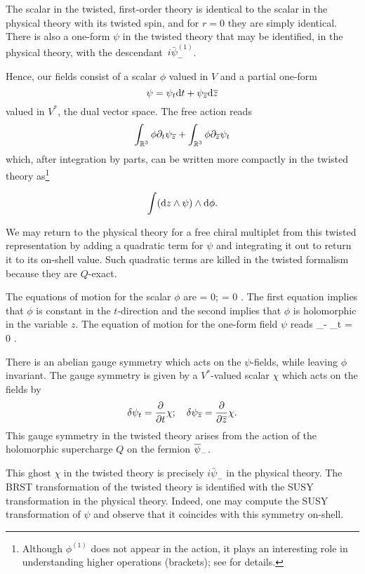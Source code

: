 \documentclass[11pt]{amsart}
\begin{document}
The scalar in the twisted, first-order theory is identical to the scalar in the physical theory with its twisted spin, and for $r=0$ they are simply identical. There is also a one-form $\psi$ in the twisted theory that may be identified, in the physical theory, with the descendant~$i \bar{\psi}_-^{(1)}$.

Hence, our fields consist of a scalar $\phi$ valued in $V$ and a partial one-form 
\[
\psi = \psi_t \d t + \psi_\zbar \d \zbar 
\]
valued in $V^*$, the dual vector space.
The free action reads
\[
\int_{\RR^3} \phi \partial_t \psi_\zbar + \int_{\RR^3} \phi \partial_\zbar \psi_t 
\]
which, after integration by parts, can be written more compactly in the twisted theory as\footnote{Although $\phi^{(1)}$ does not appear in the action, it plays an interesting role in understanding higher operations (brackets); see \cite{CDG} for details.}

\[
\int(\d z \wedge \psi) \wedge \d \phi.
\]

We may return to the physical theory for a free chiral multiplet from this twisted representation by adding a quadratic term for $\psi$ and integrating it out to return it to its on-shell value. 
Such quadratic terms are killed in the twisted formalism because they are $Q$-exact.  

The equations of motion for the scalar $\phi$ are
\beqn\label{eqn:phiEOM}
 \phi = 0; \quad
\frac{\partial}{\partial \zbar} \phi = 0 .
\eeqn
The first equation implies that $\phi$ is constant in the $t$-direction and the second implies that $\phi$ is holomorphic in the variable $z$. 
The equation of motion for the one-form field $\psi$ reads
\beqn\label{eqn:psiEOM}
 \psi_\zbar - \frac{\partial}{\partial \zbar} \psi_t = 0 .
\eeqn

There is an abelian gauge symmetry which acts on the $\psi$-fields, while leaving $\phi$ invariant.
The gauge symmetry is given by a $V^*$-valued scalar $\chi$ which acts on the fields by
\begin{equation}\label{eqn:freegauge}
\delta \psi_t = \frac{\partial}{\partial t} \chi; \quad
\delta \psi_\zbar = \frac{\partial}{\partial \zbar} \chi .
\end{equation}
This gauge symmetry in the twisted theory arises from the action of the holomorphic supercharge $Q$ on the fermion $\Bar{\psi}_-$. 

This ghost $\chi$ in the twisted theory is precisely $i \bar{\psi}_-$ in the physical theory. The BRST transformation of the twisted theory is identified with the SUSY transformation in the physical theory. Indeed, one may compute the SUSY transformation of $\psi$ and observe that it coincides with this symmetry on-shell.
\end{document}
